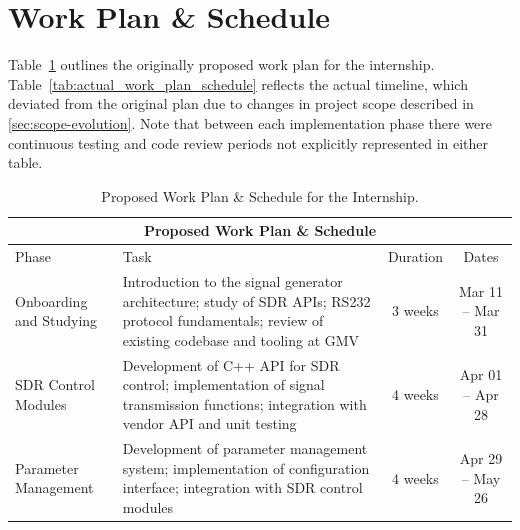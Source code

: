 \section{Work Plan \& Schedule}
\label{sec:workplan}

Table~\ref{tab:work_plan_schedule} outlines the originally proposed work plan
for the internship. Table~\ref{tab:actual_work_plan_schedule} reflects the
actual timeline, which deviated from the original plan due to changes in
project scope described in \autoref{sec:scope-evolution}. Note that between
each implementation phase there were continuous testing and code review periods
not explicitly represented in either table.

\begin{table}[htbp]
      \centering
      \caption{Proposed Work Plan \& Schedule for the Internship.}
      \label{tab:work_plan_schedule}
      \begin{tabular}{|p{3cm}|p{8cm}|c|c|}
            \hline
            \multicolumn{4}{|c|}{\textbf{Proposed Work Plan \& Schedule}}                                              \\
            \hline
            Phase                                                                & Task             & Duration & Dates \\
            \hline
            Onboarding and Studying                                              &
            Introduction to the signal generator architecture; study of \gls{SDR}
            APIs; \gls{RS232} protocol fundamentals; review of existing codebase
            and tooling at \gls{GMV}                                             &
            3 weeks                                                              & Mar 11 -- Mar 31                    \\
            \hline
            \gls{SDR} Control Modules                                            &
            Development of C++ API for \gls{SDR} control; implementation of signal
            transmission functions; integration with vendor API and unit testing &
            4 weeks                                                              & Apr 01 -- Apr 28                    \\
            \hline
            Parameter Management                                                 &
            Development of parameter management system; implementation of
            configuration interface; integration with \gls{SDR} control modules  &
            4 weeks                                                              & Apr 29 -- May 26                    \\

\end{tabular}
\end{table}
